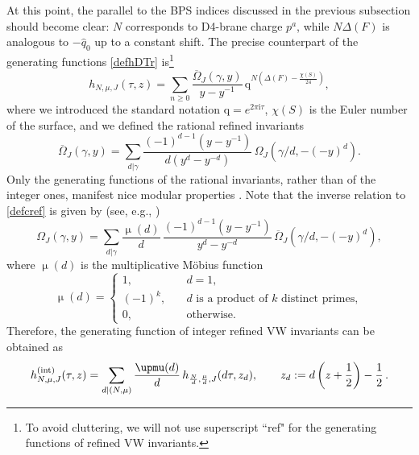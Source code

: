 \documentclass[12pt,letterpaper]{JHEP3}
\def\be{\begin{equation}}
\def\ee{\end{equation}}
\def\({\left(}
\def\){\right)}
\def\hf{{1\over 2}}
\newcommand{\I}{\mathrm{i}}
\def\bOm{\overline\Omega}
\def\hq{\hat q}
\def\hint{h^{\rm (int)}}
\newcommand{\q}{\mathrm{q}}
\begin{document}
At this point, the parallel to the BPS indices discussed in the previous subsection should become clear:
$N$ corresponds to D4-brane charge $p^a$, while $N\Delta(F)$ is analogous to $-\hq_0$ up to a constant shift.
The precise counterpart of the generating functions \eqref{defhDTr} is\footnote{To avoid cluttering, we will not use superscript ``ref"
	for the generating functions of refined VW invariants.} 
\be
\label{defhVWref}
h_{N,\mu,J}(\tau,z) =
\sum_{n\geq 0}
\frac{\bOm_J(\gamma,y)}{y-y^{-1}}\,
\q^{N\(\Delta(F) - \tfrac{\chi(S)}{24}\)},
\ee
where we introduced the standard notation $\q=e^{2\pi\I\tau}$, $\chi(S)$ is the Euler number of the surface, 
and we defined the rational refined invariants
\cite{joyce2008configurations,Manschot:2010qz}
\be
\bOm_J(\gamma,y) =  \sum_{d|\gamma} \frac{(-1)^{d-1}(y-y^{-1})}{d(y^d-y^{-d})}\, \Omega_J(\gamma/d, - (-y)^{d}).
\label{defcref}
\ee
Only the generating functions of the rational invariants, rather than of the integer ones,
manifest nice modular properties \cite{Manschot:2010xp}.
Note that the inverse relation to \eqref{defcref} is given by (see, e.g., \cite{Pioline:2025xgf})
\be
\Omega_J(\gamma,y) =  \sum_{d|\gamma} \frac{\upmu(d)}{d}\,\frac{(-1)^{d-1}(y-y^{-1})}{y^d-y^{-d}}\,  \bOm_J(\gamma/d, - (-y)^{d}),
\label{inv-ratref}
\ee
where $\upmu(d)$ is the multiplicative M\"obius function
\be 
\upmu(d)=\left\{\begin{array}{ll}
	1, & d=1,
	\\
	(-1)^k, \quad & d\mbox{ is a product of }k\mbox{ distinct primes},
	\\
	0, & \mbox{otherwise}.
\end{array}\right.
\ee 
Therefore, the generating function of integer refined VW invariants can be obtained as 
\be 
\hint_{N,\mu,J}(\tau,z)=\sum_{d|(N,\mu)} \frac{\upmu(d)}{d}\, h_{\frac{N}{d},\frac{\mu}{d},J}(d\tau,z_d),
\qquad 
z_d:=d\(z+\hf\)-\hf\, .
\label{def-hint}
\ee 
\end{document}
